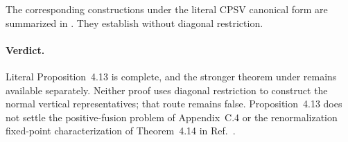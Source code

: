 \documentclass{article}
\begin{document}
The corresponding constructions under the literal CPSV canonical form are
summarized in . They establish
 without diagonal restriction.

\paragraph{Verdict.}
Literal Proposition~4.13 is complete, and the stronger theorem under
 remains available separately. Neither proof
uses diagonal restriction to construct the normal vertical representatives;
that route remains false. Proposition~4.13 does not settle the positive-fusion
problem of Appendix~C.4 or the renormalization fixed-point characterization of
Theorem~4.14 in Ref.~\cite{Cirac2016MPDO_arXiv}.



\end{document}
